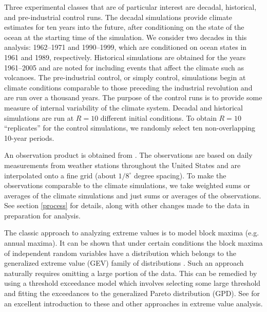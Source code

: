 Three experimental classes that are of particular interest are decadal, historical, and pre-industrial control runs. The decadal simulations provide climate estimates for ten years into the future, after conditioning on the state of the ocean at the starting time of the simulation. We consider two decades in this analysis: 1962--1971 and 1990--1999, which are conditioned on ocean states in 1961 and 1989, respectively. Historical simulations are obtained for the years 1961--2005 and are noted for including events that affect the climate such as volcanoes. The pre-industrial control, or simply control, simulations begin at climate conditions comparable to those preceding the industrial revolution and are run over a thousand years. The purpose of the control runs is to provide some measure of internal variability of the climate system. Decadal and historical simulations are run at $R=10$ different initial conditions. To obtain $R=10$ ``replicates'' for the control simulations, we randomly select ten non-overlapping 10-year periods.

An observation product is obtained from \cite{maurer2002long}. The observations are based on daily measurements from weather stations throughout the United States and are interpolated onto a fine grid (about $1/8^\circ$ degree spacing). To make the observations comparable to the climate simulations, we take weighted sums or averages of the climate simulations and just sums or averages of the observations. See section \ref{process} for details, along with other changes made to the data in preparation for analysis.

The classic approach to analyzing extreme values is to model block maxima (e.g. annual maxima). It can be shown that under certain conditions the block maxima of independent random variables have a distribution which belongs to the generalized extreme value (GEV) family of distributions \citep{coles2001introduction}. Such an approach naturally requires omitting a large portion of the data. This can be remedied by using a threshold exceedance model which involves selecting some large threshold and fitting the exceedances to the generalized Pareto distribution (GPD). See \cite{coles2001introduction} for an excellent introduction to these and other approaches in extreme value analysis.




